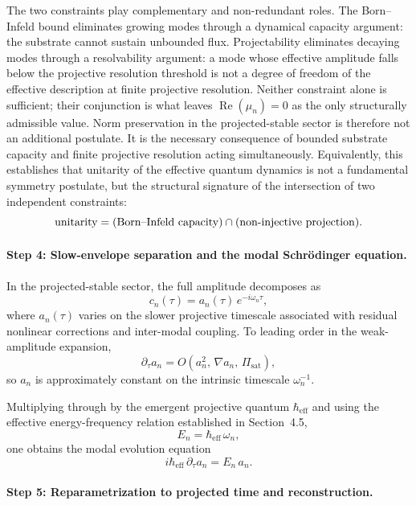     \begin{remark}
      The two constraints play complementary and non-redundant roles.
      The Born--Infeld bound eliminates growing modes through a dynamical capacity argument:
      the substrate cannot sustain unbounded flux.
      Projectability eliminates decaying modes through a resolvability argument: a mode whose
      effective amplitude falls below the projective resolution threshold is not a degree of freedom
      of the effective description at finite projective resolution.
      Neither constraint alone is sufficient; their conjunction is what leaves
      $\operatorname{Re}(\mu_n) = 0$ as the only structurally admissible value.
      Norm preservation in the projected-stable sector is therefore not an additional postulate.
      It is the necessary consequence of bounded substrate capacity and finite projective resolution
      acting simultaneously.
      Equivalently, this establishes that unitarity of the effective quantum dynamics is not a
      fundamental symmetry postulate, but the structural signature of the intersection of two
      independent constraints:
      \[
        \textup{unitarity}
        = (\textup{Born--Infeld capacity}) \cap (\textup{non-injective projection}).
      \]
    \end{remark}

  \paragraph{Step 4: Slow-envelope separation and the modal Schr\"{o}dinger equation.}

    In the projected-stable sector, the full amplitude decomposes as
    \[
      c_n(\tau) = a_n(\tau)\,e^{-i\omega_n \tau},
    \]
    where $a_n(\tau)$ varies on the slower projective timescale associated with residual
    nonlinear corrections and inter-modal coupling.
    To leading order in the weak-amplitude expansion,
    \[
      \partial_{\tau} a_n = O\!\left(a_n^2,\,\nabla a_n,\,\Pi_{\mathrm{sat}}\right),
    \]
    so $a_n$ is approximately constant on the intrinsic timescale $\omega_n^{-1}$.

    Multiplying through by the emergent projective quantum $\hbar_{\mathrm{eff}}$ and using the
    effective energy-frequency relation established in Section~4.5,
    \[
      E_n = \hbar_{\mathrm{eff}}\,\omega_n,
    \]
    one obtains the modal evolution equation
    \[
      i\hbar_{\mathrm{eff}}\,\partial_{\tau} a_n = E_n\,a_n.
    \]

  \paragraph{Step 5: Reparametrization to projected time and reconstruction.}

